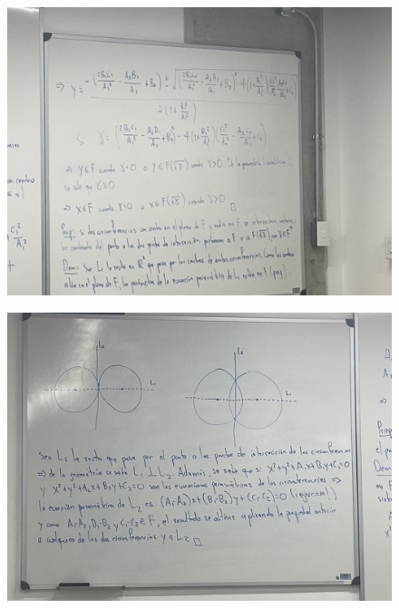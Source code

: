 \begin{figure}[H]
    \centering
    \includegraphics[scale=0.2]{imagenes/28.3.jpeg}
\end{figure}


\begin{figure}[H]
    \centering
    \includegraphics[scale=0.2]{imagenes/28.4.jpeg}
\end{figure}
